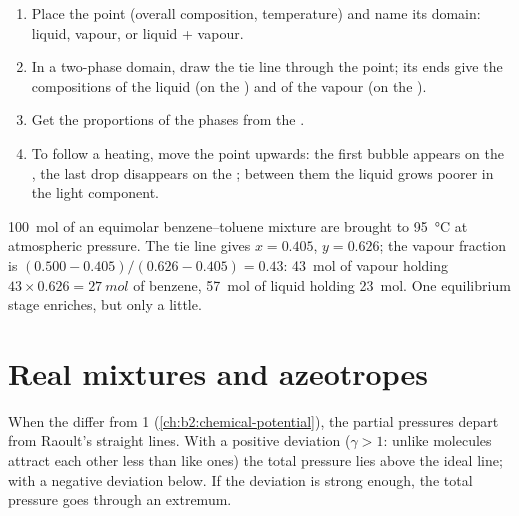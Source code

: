 \begin{method}\label{met:b2:liquid-vapour-diagrams:read-diagram}
\begin{enumerate}
  \item Place the point (overall composition, temperature) and name its
        domain: liquid, vapour, or liquid + vapour.
  \item In a two-phase domain, draw the tie line through the point; its ends
        give the compositions of the liquid (on the ) and of the
        vapour (on the ).
  \item Get the proportions of the phases from the .
  \item To follow a heating, move the point upwards: the first bubble appears
        on the , the last drop disappears on the ;
        between them the liquid grows poorer in the light component.
\end{enumerate}
\end{method}

\begin{example}\label{ex:b2:liquid-vapour-diagrams:flash}
\qty{100}{mol} of an equimolar benzene--toluene mixture are brought to
\qty{95}{\degreeCelsius} at atmospheric pressure. The tie line gives $x =
0.405$, $y = 0.626$; the vapour fraction is $(0.500 - 0.405)/(0.626 - 0.405) =
0.43$: \qty{43}{mol} of vapour holding $43 \times 0.626 = \qty{27}{mol}$ of
benzene, \qty{57}{mol} of liquid holding \qty{23}{mol}. One equilibrium stage
enriches, but only a little.
\end{example}

\section{Real mixtures and azeotropes}

When the  differ from 1 (\cref{ch:b2:chemical-potential}),
the partial pressures depart from Raoult's straight lines. With a positive
deviation ($\gamma > 1$: unlike molecules attract each other less than like
ones) the total pressure lies above the ideal line; with a negative deviation
below. If the deviation is strong enough, the total pressure goes through an
extremum.

